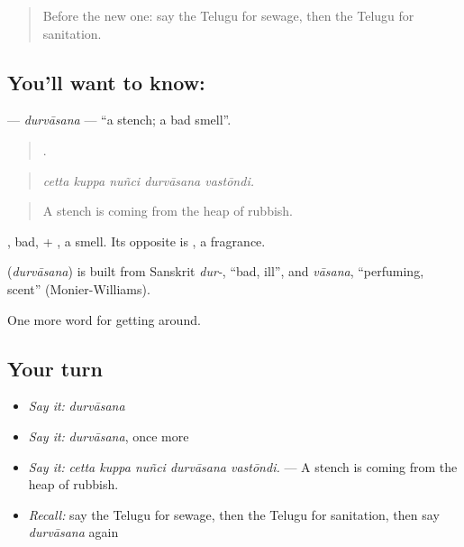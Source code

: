 \label{lesson:TE-C468-durvasana}



\begin{quote}
Before the new one: say the Telugu for sewage, then the Telugu for sanitation.
\end{quote}

\subsection*{You'll want to know: }
\textbf{} — \emph{durvāsana} — \textquotedblleft{}a stench; a bad smell\textquotedblright{}.

\begin{quote}
    .
\end{quote}

\begin{quote}
\emph{cetta kuppa nuñci durvāsana vastōndi.}
\end{quote}

\begin{quote}
A stench is coming from the heap of rubbish.
\end{quote}

, bad, + , a smell. Its opposite is , a fragrance.

\begin{cousinweb}
\textbf{} (\emph{durvāsana}) is built from Sanskrit \emph{dur-}, \textquotedblleft{}bad, ill\textquotedblright{}, and \emph{vāsana}, \textquotedblleft{}perfuming, scent\textquotedblright{} (Monier-Williams).
\end{cousinweb}

\begin{grammarlens}[title={What you've built}]
One more word for getting around.
\end{grammarlens}

\subsection*{Your turn}
\begin{itemize}
\raggedright
  \item \emph{Say it:} \emph{durvāsana}
  \item \emph{Say it:} \emph{durvāsana}, once more
  \item \emph{Say it:} \emph{cetta kuppa nuñci durvāsana vastōndi.} — A stench is coming from the heap of rubbish.
  \item \emph{Recall:} say the Telugu for sewage, then the Telugu for sanitation, then say \emph{durvāsana} again
\end{itemize}

